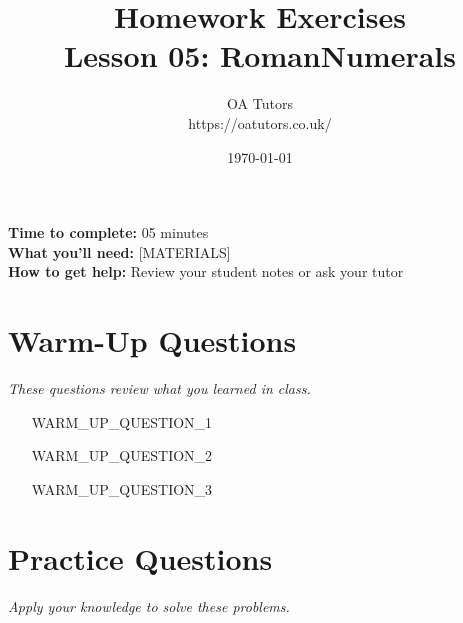 \documentclass[a4paper,12pt]{article}
\begin{document}
\title{\textcolor{oablue}{\Huge Homework Exercises} \\ 
       \textcolor{oablue}{\Large Lesson 05: RomanNumerals}}
\author{\textcolor{oablue}{OA Tutors} \\ 
        \textcolor{oagray}{https://oatutors.co.uk/}}
\date{\textcolor{oagray}{\today}}

\maketitle

\begin{instruction}
\textbf{Time to complete:} 05 minutes \\
\textbf{What you'll need:} [MATERIALS] \\
\textbf{How to get help:} Review your student notes or ask your tutor
\end{instruction}

\section{Warm-Up Questions}
\textit{These questions review what you learned in class.}

\begin{enumerate}
    \item [WARM_UP_QUESTION_1]
    
    \vspace{2cm}
    
    \item [WARM_UP_QUESTION_2]
    
    \vspace{2cm}
    
    \item [WARM_UP_QUESTION_3]
    
    \vspace{2cm}
\end{enumerate}

\section{Practice Questions}
\textit{Apply your knowledge to solve these problems.}
\end{document}
